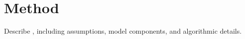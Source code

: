 \section{Method}

Describe \methodname{}, including assumptions, model components, and algorithmic details.
